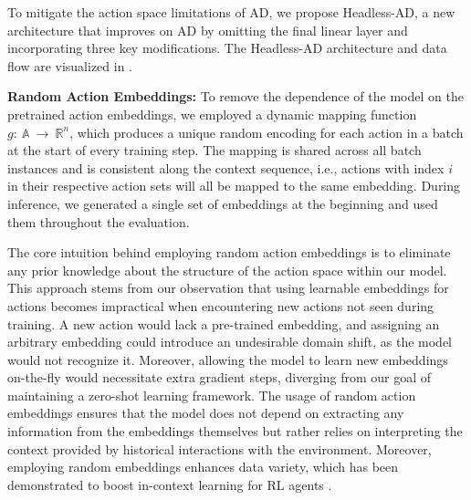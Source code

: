 To mitigate the action space limitations of AD, we propose Headless-AD, a new architecture that improves on AD by omitting the final linear layer and incorporating three key modifications. The Headless-AD architecture and data flow are visualized in .


\textbf{Random Action Embeddings:} To remove the dependence of the model on the pretrained action embeddings, we employed a dynamic mapping function $g:~\mathbb{A}~\rightarrow~\mathbb{R}^n$, which produces a unique random encoding for each action in a batch at the start of every training step. The mapping is shared across all batch instances and is consistent along the context sequence, i.e., actions with index $i$ in their respective action sets will all be mapped to the same embedding. During inference, we generated a single set of embeddings at the beginning and used them throughout the evaluation.

The core intuition behind employing random action embeddings is to eliminate any prior knowledge about the structure of the action space within our model. This approach stems from our observation that using learnable embeddings for actions becomes impractical when encountering new actions not seen during training. A new action would lack a pre-trained embedding, and assigning an arbitrary embedding could introduce an undesirable domain shift, as the model would not recognize it. Moreover, allowing the model to learn new embeddings on-the-fly would necessitate extra gradient steps, diverging from our goal of maintaining a zero-shot learning framework. The usage of random action embeddings ensures that the model does not depend on extracting any information from the embeddings themselves but rather relies on interpreting the context provided by historical interactions with the environment. Moreover, employing random embeddings enhances data variety, which has been demonstrated to boost in-context learning for RL agents \citep{kirsch2023towards, lu2023structured}.



